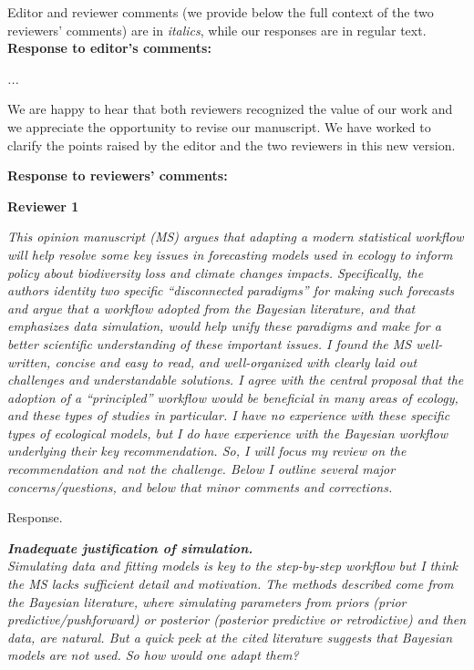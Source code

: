 \documentclass[11pt,letter]{article}
\begin{document}
\setlength{\parindent}{0cm}
\setlength{\parskip}{7pt}

Editor and reviewer comments (we provide below the full context of the two reviewers' comments) are in \emph{italics}, while our responses are in regular text. \\ 

{\bf Response to editor's comments:} 

\begin{mybox}
\emph{...}
\end{mybox}

We are happy to hear that both reviewers recognized the value of our work and we appreciate the opportunity to revise our manuscript. We have worked to clarify the points raised by the editor and the two reviewers in this new version.

{\bf Response to reviewers' comments:} 

{\bf Reviewer 1}

\begin{mybox}
\emph{This opinion manuscript (MS) argues that adapting a modern statistical workflow will help resolve some key issues in forecasting models used in ecology to inform policy about biodiversity loss and climate changes impacts. Specifically, the authors identity two specific “disconnected paradigms” for making such forecasts and argue that a workflow adopted from the Bayesian literature, and that emphasizes data simulation, would help unify these paradigms and make for a better scientific understanding of these important issues. I found the MS well-written, concise and easy to read, and well-organized with clearly laid out challenges and understandable solutions. I agree with the central proposal that the adoption of a “principled” workflow would be beneficial in many areas of ecology, and these types of studies in particular. I have no experience with these specific types of ecological models, but I do have experience with the Bayesian workflow underlying their key recommendation. So, I will focus my review on the recommendation and not the challenge. Below I outline several major concerns/questions, and below that minor comments and corrections.}
\end{mybox}

Response.

\begin{mybox}
\emph{\textbf{Inadequate justification of simulation.}\\
Simulating data and fitting models is key to the step-by-step workflow but I think the MS lacks sufficient detail and motivation. The methods described come from the Bayesian literature, where simulating parameters from priors (prior predictive/pushforward) or posterior (posterior predictive or retrodictive) and then data, are natural. But a quick peek at the cited literature suggests that Bayesian models are not used. So how would one adapt them?}
\end{mybox}
\end{document}
